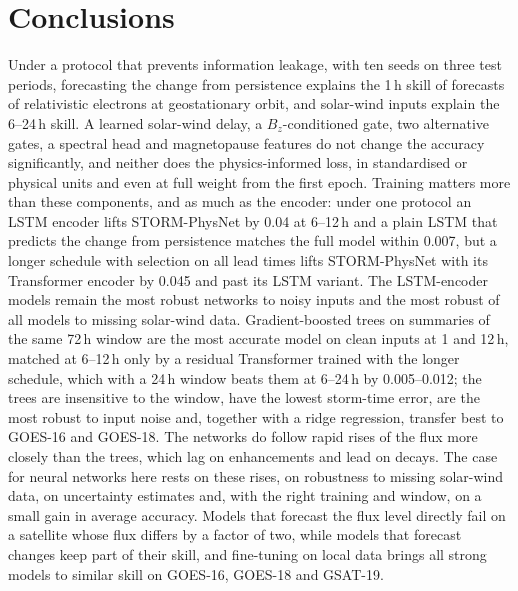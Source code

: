 \documentclass[a4paper,fleqn]{cas-dc}
\begin{document}
\section{Conclusions}
\label{sec:conclusion}
Under a protocol that prevents information leakage, with ten seeds on three test periods, forecasting the
change from persistence explains the 1\,h skill of forecasts of relativistic electrons at geostationary orbit,
and solar-wind inputs explain the 6--24\,h skill. A learned solar-wind delay, a \(B_z\)-conditioned gate, two
alternative gates, a spectral head and magnetopause features do not change the accuracy significantly, and
neither does the physics-informed loss, in standardised or physical units and even at full weight from the
first epoch. Training matters more than these components, and as much as the encoder: under one
protocol an LSTM encoder lifts STORM-PhysNet by 0.04 at 6--12\,h and a plain LSTM that predicts the change from
persistence matches the full model within 0.007, but a longer schedule with selection on all lead times lifts
STORM-PhysNet with its Transformer encoder by 0.045 and past its LSTM variant. The LSTM-encoder models remain the
most robust networks to noisy inputs and the most robust of all models to missing solar-wind data.
Gradient-boosted trees on summaries of the same 72\,h window are the most accurate model on clean inputs at 1 and
12\,h, matched at 6--12\,h only by a residual Transformer trained with the longer schedule, which with a 24\,h window
beats them at 6--24\,h by 0.005--0.012; the trees are insensitive to the window, have the lowest storm-time error,
are the most robust to input noise and, together with a ridge regression, transfer best to GOES-16 and GOES-18.
The networks do follow rapid rises of the flux more closely than the trees, which lag on enhancements and lead on
decays. The case for neural networks here rests on these rises, on robustness to missing solar-wind data, on
uncertainty estimates and, with the right training and window, on a small gain in average accuracy. Models that forecast the flux level directly fail on a satellite whose flux differs by a
factor of two, while models that forecast changes keep part of their skill, and fine-tuning on local data
brings all strong models to similar skill on GOES-16, GOES-18 and GSAT-19.

\FloatBarrier
\end{document}
